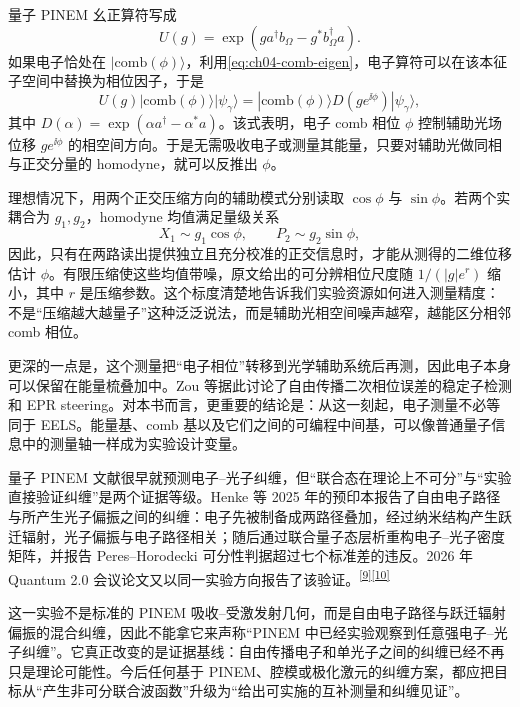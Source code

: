 量子 PINEM 幺正算符写成
\begin{equation}
U(g)=\exp\!\left(g a^\dagger b_\Omega-g^*b_\Omega^\dagger a\right).
\label{eq:ch04-comb-unitary}
\end{equation}
如果电子恰处在 $|\mathrm{comb}(\phi)\rangle$，利用\cref{eq:ch04-comb-eigen}，电子算符可以在该本征子空间中替换为相位因子，于是
\begin{equation}
U(g)|\mathrm{comb}(\phi)\rangle|\psi_\gamma\rangle
=|\mathrm{comb}(\phi)\rangle
D\!\left(ge^{\ii\phi}\right)|\psi_\gamma\rangle,
\label{eq:ch04-comb-displacement}
\end{equation}
其中 $D(\alpha)=\exp(\alpha a^\dagger-\alpha^*a)$。该式表明，电子 comb 相位 $\phi$ 控制辅助光场位移 $ge^{\ii\phi}$ 的相空间方向。于是无需吸收电子或测量其能量，只要对辅助光做同相与正交分量的 homodyne，就可以反推出 $\phi$。

理想情况下，用两个正交压缩方向的辅助模式分别读取 $\cos\phi$ 与 $\sin\phi$。若两个实耦合为 $g_1,g_2$，homodyne 均值满足量级关系
\begin{equation}
X_1\sim g_1\cos\phi,\qquad P_2\sim g_2\sin\phi,
\label{eq:ch04-comb-quadrature}
\end{equation}
因此，只有在两路读出提供独立且充分校准的正交信息时，才能从测得的二维位移估计 $\phi$。有限压缩使这些均值带噪，原文给出的可分辨相位尺度随 $1/(|g|e^r)$ 缩小，其中 $r$ 是压缩参数。这个标度清楚地告诉我们实验资源如何进入测量精度：不是“压缩越大越量子”这种泛泛说法，而是辅助光相空间噪声越窄，越能区分相邻 comb 相位。

更深的一点是，这个测量把“电子相位”转移到光学辅助系统后再测，因此电子本身可以保留在能量梳叠加中。Zou 等据此讨论了自由传播二次相位误差的稳定子检测和 EPR steering。对本书而言，更重要的结论是：从这一刻起，电子测量不必等同于 EELS。能量基、comb 基以及它们之间的可编程中间基，可以像普通量子信息中的测量轴一样成为实验设计变量。

量子 PINEM 文献很早就预测电子--光子纠缠，但“联合态在理论上不可分”与“实验直接验证纠缠”是两个证据等级。Henke 等 2025 年的预印本报告了自由电子路径与所产生光子偏振之间的纠缠：电子先被制备成两路径叠加，经过纳米结构产生跃迁辐射，光子偏振与电子路径相关；随后通过联合量子态层析重构电子--光子密度矩阵，并报告 Peres--Horodecki 可分性判据超过七个标准差的违反。2026 年 Quantum 2.0 会议论文又以同一实验方向报告了该验证。\textsuperscript{\hyperref[ch04-ref9]{[9]}\hyperref[ch04-ref10]{[10]}}

这一实验不是标准的 PINEM 吸收--受激发射几何，而是自由电子路径与跃迁辐射偏振的混合纠缠，因此不能拿它来声称“PINEM 中已经实验观察到任意强电子--光子纠缠”。它真正改变的是证据基线：自由传播电子和单光子之间的纠缠已经不再只是理论可能性。今后任何基于 PINEM、腔模或极化激元的纠缠方案，都应把目标从“产生非可分联合波函数”升级为“给出可实施的互补测量和纠缠见证”。

